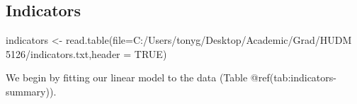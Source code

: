 \documentclass[
]{article}
\newenvironment{Shaded}{\begin{snugshade}}{\end{snugshade}}
\newcommand{\AttributeTok}[1]{\textcolor[rgb]{0.77,0.63,0.00}{#1}}
\newcommand{\ConstantTok}[1]{\textcolor[rgb]{0.00,0.00,0.00}{#1}}
\newcommand{\FunctionTok}[1]{\textcolor[rgb]{0.00,0.00,0.00}{#1}}
\newcommand{\NormalTok}[1]{#1}
\newcommand{\OtherTok}[1]{\textcolor[rgb]{0.56,0.35,0.01}{#1}}
\newcommand{\SpecialCharTok}[1]{\textcolor[rgb]{0.00,0.00,0.00}{#1}}
\newcommand{\StringTok}[1]{\textcolor[rgb]{0.31,0.60,0.02}{#1}}
\begin{document}
\hypertarget{indicators}{%
\subsection{Indicators}\label{indicators}}

\begin{Shaded}
\begin{Highlighting}[]
\NormalTok{indicators }\OtherTok{\textless{}{-}} \FunctionTok{read.table}\NormalTok{(}\AttributeTok{file=}\StringTok{\textquotesingle{}C:/Users/tonyg/Desktop/Academic/Grad/HUDM 5126/indicators.txt\textquotesingle{}}\NormalTok{,}\AttributeTok{header =} \ConstantTok{TRUE}\NormalTok{)}
\end{Highlighting}
\end{Shaded}

We begin by fitting our linear model to the data (Table
@ref(tab:indicators-summary)).

\begin{Shaded}
\end{Shaded}
\end{document}

